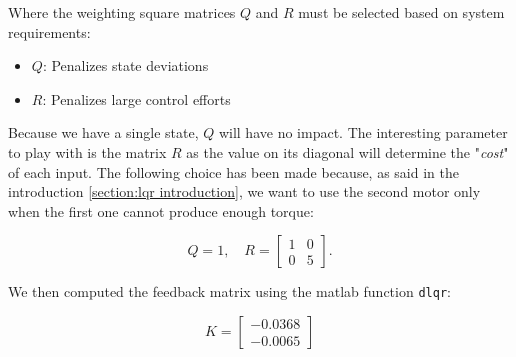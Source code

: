 Where the weighting square matrices \( Q \) and \( R \) must be selected based on system requirements:

\begin{itemize}
    \item \( Q \): Penalizes state deviations
    \item \( R \): Penalizes large control efforts
\end{itemize}

Because we have a single state, $Q$ will have no impact. The interesting parameter to play with is the matrix $R$ as the
value on its diagonal will determine the "\textit{cost}" of each input. The following choice has been made because, as 
said in the introduction \ref{section:lqr introduction}, we want to use the second motor only when the first one cannot 
produce enough torque:

\[
Q = 1, \quad
R = \begin{bmatrix}
1 & 0 \\
0 & 5
\end{bmatrix}.
\]

We then computed the feedback matrix using the matlab function \texttt{dlqr}:

\[
K = \begin{bmatrix}
    -0.0368\\
    -0.0065
\end{bmatrix}
\]

